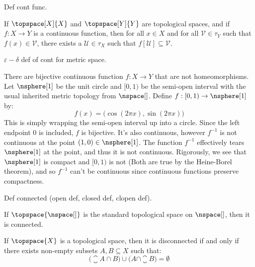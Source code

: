 \documentclass{book}                                                           %
\begin{document}
            Def cont func.
            \begin{theorem}
                If $\topspace[X]{X}$ and $\topspace[Y]{Y}$ are topological spaces,
                and if $f:X\rightarrow{Y}$ is a continuous function, then for all
                $x\in{X}$ and for all $\mathcal{V}\in\tau_{Y}$ such that
                $f(x)\in\mathcal{V}$, there exists a $\mathcal{U}\in\tau_{X}$ such
                that $f[\mathcal{U}]\subseteq\mathcal{V}$.
            \end{theorem}
            $\varepsilon-\delta$ def of cont for metric space.
            \begin{example}
                There are bijective continuous function $f:X\rightarrow{Y}$ that
                are not homeomorphisms. Let $\nsphere[1]$ be the unit circle and
                $[0,1)$ be the semi-open interval with the usual inherited metric
                topology from $\nspace[]$. Define $f:[0,1)\rightarrow\nsphere[1]$
                by:
                \begin{equation}
                    f(x)=\big(\cos(2\pi{x}),\sin(2\pi{x})\big)
                \end{equation}
                This is simply wrapping the semi-open interval up into a circle.
                Since the left endpoint 0 is included, $f$ is bijective. It's also
                continuous, however $f^{\minus{1}}$ is not continuous at the point
                $(1,0)\in\nsphere[1]$. The function $f^{\minus{1}}$ effectively
                tears $\nsphere[1]$ at the point, and thus it is not continuous.
                Rigorously, we see that $\nsphere[1]$ is compact and $[0,1)$ is not
                (Both are true by the Heine-Borel theorem), and so $f^{\minus{1}}$
                can't be continuous since continuous functions preserve compactness.
            \end{example}
            Def connected (open def, closed def, clopen def).
            \begin{theorem}
                If $\topspace{\nspace[]}$ is the standard topological space on
                $\nspace[]$, then it is connected.
            \end{theorem}
            \begin{theorem}
                If $\topspace{X}$ is a topological space, then it is disconnected
                if and only if there exists non-empty subsets $A,B\subseteq{X}$ such
                that:
                \begin{equation}
                    \big(\closure{A}\cap{B}\big)\cup\big(A\cap\closure{B}\big)
                    =\emptyset
                \end{equation}
            \end{theorem}
\end{document}

